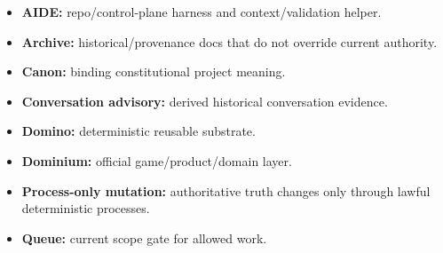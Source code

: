 \documentclass[10.5pt,a4paper,openany]{book}
\begin{document}
\begin{itemize}
\item \textbf{AIDE:} repo/\allowbreak{}control-\allowbreak{}plane harness and context/\allowbreak{}validation helper.\allowbreak{}
\item \textbf{Archive:} historical/\allowbreak{}provenance docs that do not override current authority.\allowbreak{}
\item \textbf{Canon:} binding constitutional project meaning.\allowbreak{}
\item \textbf{Conversation advisory:} derived historical conversation evidence.\allowbreak{}
\item \textbf{Domino:} deterministic reusable substrate.\allowbreak{}
\item \textbf{Dominium:} official game/\allowbreak{}product/\allowbreak{}domain layer.\allowbreak{}
\item \textbf{Process-only mutation:} authoritative truth changes only through lawful deterministic processes.\allowbreak{}
\item \textbf{Queue:} current scope gate for allowed work.\allowbreak{}
\end{itemize}
\end{document}
